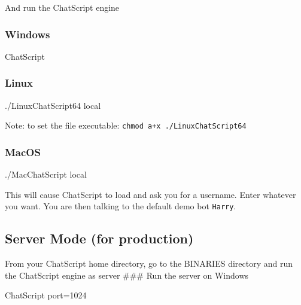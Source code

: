 \documentclass[]{article}
\newenvironment{Shaded}{}{}
\newcommand{\ExtensionTok}[1]{#1}
\newcommand{\NormalTok}[1]{#1}
\begin{document}
And run the ChatScript engine

\subsubsection{Windows}\label{windows}

\begin{Shaded}
\begin{Highlighting}[]
\ExtensionTok{ChatScript}
\end{Highlighting}
\end{Shaded}

\subsubsection{Linux}\label{linux}

\begin{Shaded}
\begin{Highlighting}[]
\ExtensionTok{./LinuxChatScript64}\NormalTok{ local}
\end{Highlighting}
\end{Shaded}

Note: to set the file executable:
\texttt{chmod\ a+x\ ./LinuxChatScript64}

\subsubsection{MacOS}\label{macos}

\begin{Shaded}
\begin{Highlighting}[]
\ExtensionTok{./MacChatScript}\NormalTok{ local}
\end{Highlighting}
\end{Shaded}

This will cause ChatScript to load and ask you for a username. Enter
whatever you want. You are then talking to the default demo bot
\texttt{Harry}.

\subsection{Server Mode (for
production)}\label{server-mode-for-production}

From your ChatScript home directory, go to the BINARIES directory and
run the ChatScript engine as server \#\#\# Run the server on Windows

\begin{Shaded}
\begin{Highlighting}[]
\ExtensionTok{ChatScript}\NormalTok{ port=1024}
\end{Highlighting}
\end{Shaded}
\end{document}
